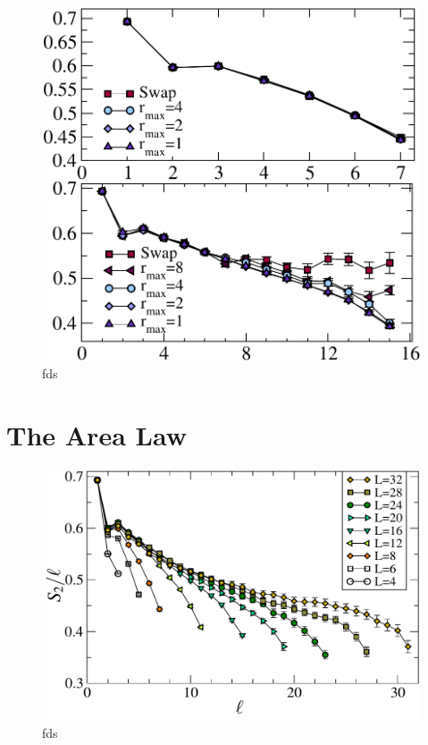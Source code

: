 \begin{figure} {
	\includegraphics[width=5in]{./figures/paper2/fig_2DA/fig_L8n16.pdf} 
	\centering
	\caption[fds]{ fds
	\label{2Dfig}
	}
} \end{figure}

\section{The Area Law}

\begin{figure} {
	\includegraphics[width=5in]{./figures/paper2/fig_AreaL/fig4.pdf} 
	\centering
	\caption[fds]{ fds
	\label{2Dfig}
	}
} \end{figure}

